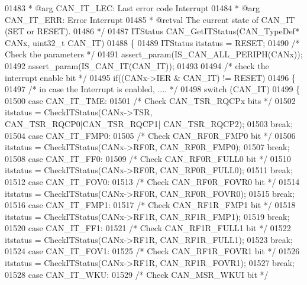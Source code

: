 \begin{DoxyCode}
01483 \textcolor{comment}{  *            @arg CAN\_IT\_LEC: Last error code Interrupt}
01484 \textcolor{comment}{  *            @arg CAN\_IT\_ERR: Error Interrupt}
01485 \textcolor{comment}{  * @retval The current state of CAN\_IT (SET or RESET).}
01486 \textcolor{comment}{  */}
01487 ITStatus CAN_GetITStatus(CAN\_TypeDef* CANx, uint32\_t CAN\_IT)
01488 \{
01489   ITStatus itstatus = RESET;
01490   \textcolor{comment}{/* Check the parameters */}
01491   assert_param(IS\_CAN\_ALL\_PERIPH(CANx));
01492   assert_param(IS\_CAN\_IT(CAN\_IT));
01493 
01494   \textcolor{comment}{/* check the interrupt enable bit */}
01495  \textcolor{keywordflow}{if}((CANx->IER & CAN\_IT) != RESET)
01496  \{
01497    \textcolor{comment}{/* in case the Interrupt is enabled, .... */}
01498     \textcolor{keywordflow}{switch} (CAN\_IT)
01499     \{
01500       \textcolor{keywordflow}{case} CAN_IT_TME:
01501         \textcolor{comment}{/* Check CAN\_TSR\_RQCPx bits */}
01502         itstatus = CheckITStatus(CANx->TSR, CAN_TSR_RQCP0|CAN_TSR_RQCP1|
      CAN_TSR_RQCP2);
01503         \textcolor{keywordflow}{break};
01504       \textcolor{keywordflow}{case} CAN_IT_FMP0:
01505         \textcolor{comment}{/* Check CAN\_RF0R\_FMP0 bit */}
01506         itstatus = CheckITStatus(CANx->RF0R, CAN_RF0R_FMP0);
01507         \textcolor{keywordflow}{break};
01508       \textcolor{keywordflow}{case} CAN_IT_FF0:
01509         \textcolor{comment}{/* Check CAN\_RF0R\_FULL0 bit */}
01510         itstatus = CheckITStatus(CANx->RF0R, CAN_RF0R_FULL0);
01511         \textcolor{keywordflow}{break};
01512       \textcolor{keywordflow}{case} CAN_IT_FOV0:
01513         \textcolor{comment}{/* Check CAN\_RF0R\_FOVR0 bit */}
01514         itstatus = CheckITStatus(CANx->RF0R, CAN_RF0R_FOVR0);
01515         \textcolor{keywordflow}{break};
01516       \textcolor{keywordflow}{case} CAN_IT_FMP1:
01517         \textcolor{comment}{/* Check CAN\_RF1R\_FMP1 bit */}
01518         itstatus = CheckITStatus(CANx->RF1R, CAN_RF1R_FMP1);
01519         \textcolor{keywordflow}{break};
01520       \textcolor{keywordflow}{case} CAN_IT_FF1:
01521         \textcolor{comment}{/* Check CAN\_RF1R\_FULL1 bit */}
01522         itstatus = CheckITStatus(CANx->RF1R, CAN_RF1R_FULL1);
01523         \textcolor{keywordflow}{break};
01524       \textcolor{keywordflow}{case} CAN_IT_FOV1:
01525         \textcolor{comment}{/* Check CAN\_RF1R\_FOVR1 bit */}
01526         itstatus = CheckITStatus(CANx->RF1R, CAN_RF1R_FOVR1);
01527         \textcolor{keywordflow}{break};
01528       \textcolor{keywordflow}{case} CAN_IT_WKU:
01529         \textcolor{comment}{/* Check CAN\_MSR\_WKUI bit */}

\end{DoxyCode}
